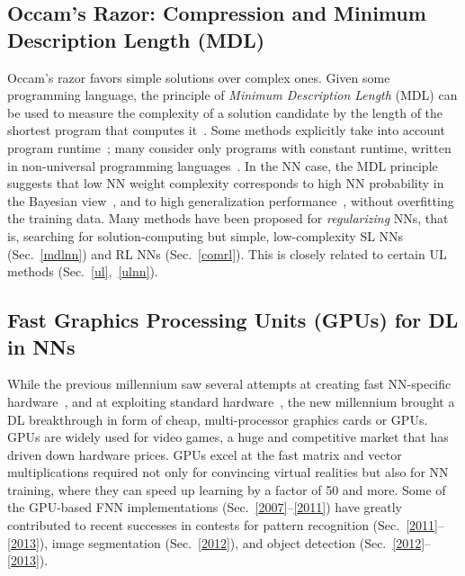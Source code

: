 \documentclass[letterpaper]{article}
\begin{document}
\begin{CJK*}{UTF8}{gbsn}
\subsection{Occam's Razor: Compression and Minimum Description Length (MDL)}
\label{mdl}

Occam's razor favors simple solutions over complex ones.
Given some programming language,
the principle of {\em Minimum Description Length} (MDL) can be used 
to measure the complexity of a solution candidate by
the length of the shortest program that 
computes it~\citep[e.g.,][]{Solomonoff:64,Kolmogorov:65,Chaitin:66,Wallace:68,Levin:73a,Solomonoff:78,Rissanen:86,Blumer:87,LiVitanyi:97,gruenwald2005}.
Some methods explicitly take into account program runtime~\citep{Allender:92,Watanabe:92,Schmidhuber:97nn+,Schmidhuber:02colt}; 
many consider only programs with constant runtime, written
in non-universal programming languages~\citep[e.g.,][]{Rissanen:86,Hinton:93}.
In the NN case, 
the MDL principle suggests that low NN weight complexity
corresponds to high NN probability 
in the  Bayesian view~\citep[e.g.,][]{MacKay:92b,Buntine:91,neal1995,freitas2003},
and to high generalization performance~\citep[e.g.,][]{BaumHaussler:89}, 
without overfitting the training data.
Many methods have been proposed for {\em regularizing} NNs, that is, 
searching for solution-computing but simple, low-complexity SL NNs (Sec.~\ref{mdlnn}) 
and RL NNs (Sec.~\ref{comrl}).
This is closely 
related to certain UL methods (Sec.~\ref{ul},~\ref{ulnn}).



\subsection{Fast Graphics Processing Units (GPUs) for DL in NNs}
\label{gpu}

While the previous millennium saw several attempts at creating fast NN-specific hardware~\citep[e.g.,][]{jackel-90,faggin92,ramacher93,widrow94,heemskerk1995,cbm97,urlbe1999},
and at exploiting standard hardware~\citep[e.g.,][]{anguita1994,muller1995,anguita1996},
the new millennium brought a DL breakthrough in form of cheap, multi-processor
graphics cards or GPUs. GPUs are widely used for video games, a huge and competitive market
that has driven down hardware prices.
GPUs excel at the fast matrix and vector multiplications required not only for 
convincing virtual realities but also for NN training, 
where they can speed up learning by a factor of  50 and more.
Some of the GPU-based FNN implementations (Sec.~\ref{2007}--\ref{2011}) have greatly contributed to recent successes in contests for pattern recognition (Sec.~\ref{2011}--\ref{2013}),
image segmentation (Sec.~\ref{2012}),
and object detection (Sec.~\ref{2012}--\ref{2013}).
 



\end{CJK*}
\end{document}
